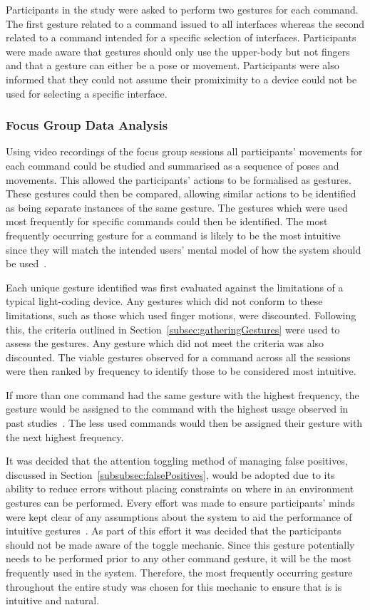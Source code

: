 \documentclass[link]{IWCOMP}
\begin{document}
Participants in the study were asked to perform two gestures for each command.
The first gesture related to a command issued to all interfaces whereas the second related to a command intended for a specific selection of interfaces.
Participants were made aware that gestures should only use the upper-body but not fingers and that a gesture can either be a pose or movement.
Participants were also informed that they could not assume their promiximity to a device could not be used for selecting a specific interface.

\subsubsection{Focus Group Data Analysis}
\label{subsubsec:focusGroupDataAnalysis}

Using video recordings of the focus group sessions all participants' movements for each command could be studied and summarised as a sequence of poses and movements.
This allowed the participants' actions to be formalised as gestures.
These gestures could then be compared, allowing similar actions to be identified as being separate instances of the same gesture.
The gestures which were used most frequently for specific commands could then be identified.
The most frequently occurring gesture for a command is likely to be the most intuitive since they will match the intended users' mental model of how the system should be used~\citep{Nielsen2004,Ruiz2011,Wobbrock2009}.

Each unique gesture identified was first evaluated against the limitations of a typical light-coding device.
Any gestures which did not conform to these limitations, such as those which used finger motions, were discounted.
Following this, the criteria outlined in Section~\ref{subsec:gatheringGestures} were used to assess the gestures.
Any gesture which did not meet the criteria was also discounted.
The viable gestures observed for a command across all the sessions were then ranked by frequency to identify those to be considered most intuitive.

If more than one command had the same gesture with the highest frequency, the gesture would be assigned to the command with the highest usage observed in past studies~\citep{HatchA.HigginsSMercier2009}.
The less used commands would then be assigned their gesture with the next highest frequency.

It was decided that the attention toggling method of managing false positives, discussed in Section~\ref{subsubsec:falsePositives}, would be adopted due to its ability to reduce errors without placing constraints on where in an environment gestures can be performed.
Every effort was made to ensure participants' minds were kept clear of any assumptions about the system to aid the performance of intuitive gestures~\citep{Nielsen2004}.
As part of this effort it was decided that the participants should not be made aware of the toggle mechanic.
Since this gesture potentially needs to be performed prior to any other command gesture, it will be the most frequently used in the system.
Therefore, the most frequently occurring gesture throughout the entire study was chosen for this mechanic to ensure that is is intuitive and natural.
\end{document}
